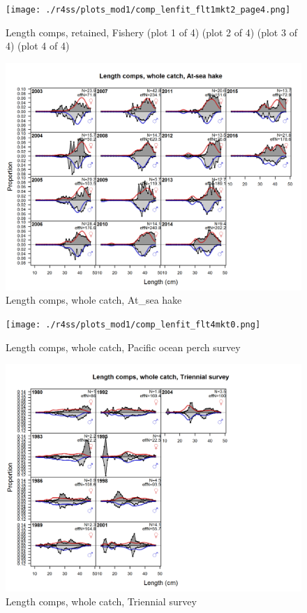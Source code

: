 \documentclass[12pt,]{article}
\begin{document}
\begin{figure}
\centering
\texttt{[image: ./r4ss/plots\_mod1/comp\_lenfit\_flt1mkt2\_page4.png]}
\caption{Length comps, retained, Fishery (plot 1 of 4) (plot 2 of 4)
(plot 3 of 4) (plot 4 of 4) \label{fig:length_fits}}
\end{figure}

\begin{figure}
\centering
\includegraphics{./r4ss/plots_mod1/comp_lenfit_flt2mkt0.png}
\caption{Length comps, whole catch, At\_sea hake
\label{fig:length_fits}}
\end{figure}

\begin{figure}
\centering
\texttt{[image: ./r4ss/plots\_mod1/comp\_lenfit\_flt4mkt0.png]}
\caption{Length comps, whole catch, Pacific ocean perch survey
\label{fig:length_fits}}
\end{figure}

\begin{figure}
\centering
\includegraphics{./r4ss/plots_mod1/comp_lenfit_flt5mkt0.png}
\caption{Length comps, whole catch, Triennial survey
\label{fig:length_fits}}
\end{figure}
\end{document}
